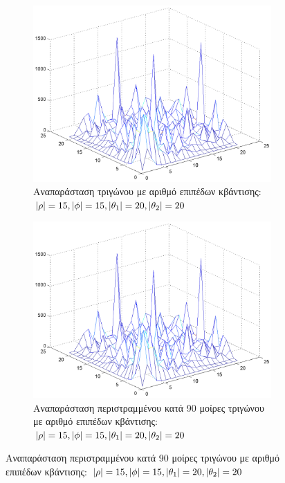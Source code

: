 \begin{figure}
        \centering
        \begin{subfigure}[b]{1\textwidth}
                \centerline{\includegraphics[scale = 0.3]{./images/examples/trigwno(15152020).png}}
                \caption{Αναπαράσταση τριγώνου με αριθμό επιπέδων κβάντισης: $\lvert\rho\rvert = 15,\lvert\phi\rvert = 15,\lvert\theta_1\rvert = 20,\lvert\theta_2\rvert = 20$}
        \end{subfigure}%

        \centering
        \begin{subfigure}[b]{1\textwidth}
                \centerline{\includegraphics[scale = 0.3]{./images/examples/trigwno90(15152020).png}}
                \caption{Αναπαράσταση περιστραμμένου κατά 90 μοίρες τριγώνου με αριθμό επιπέδων κβάντισης: $\lvert\rho\rvert = 15,\lvert\phi\rvert = 15,\lvert\theta_1\rvert = 20,\lvert\theta_2\rvert = 20$}
        \end{subfigure}%
\end{figure}


